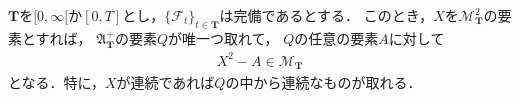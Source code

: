 	\begin{comment}
	\begin{screen}
		\begin{dfn}[ナチュラル]
			$(\Omega,\mathscr{F},P)$を確率空間とし，$\mathbf{T}$を$[0,\infty[$か$[0,T]$とし，
			$\{\mathscr{F}_t\}_{t \in \mathbf{T}}$を$\mathscr{F}$に付随するフィルトレーションとする．
			$A$が$(\Omega,\mathscr{F},P)$上の$\{\mathscr{F}_t\}_{t \in \mathbf{T}}$-増大過程であって，
			かつ$M$を任意に与えられた$(\Omega,\mathscr{F},P)$上の有界かつ$RCLL$な
			$\{\mathscr{F}_t\}_{t \in \mathbf{T}}$-マルチンゲールとするときに
			\begin{align}
				\forall t \in \mathbf{T}\, 
				\left[\, E(M_t A_t) = E \int_{(0,t]} M_{s-}\ dA_s\, \right]
			\end{align}
			を満たすならば，$A$は{\bf ナチュラル}\index{ナチュラル}{\bf (natural)}であるという．
		\end{dfn}
	\end{screen}
	\end{comment}
	
	\begin{screen}
		\begin{thm}[二乗可積分マルチンゲールは増大過程とマルチンゲールに分解できる]
		\label{thm:decomposition_of_local_martingales}
			$\mathbf{T}$を$[0,\infty[$か$[0,T]$とし，$\{\mathscr{F}_t\}_{t \in \mathbf{T}}$は完備であるとする．
			このとき，$X$を$\mathscr{M}^2_{\mathbf{T}}$の要素とすれば，
			$\mathfrak{A}^+_{\mathbf{T}}$の要素$Q$が唯一つ取れて，
			$Q$の任意の要素$A$に対して
			\begin{align}
				X^2 - A \in \mathscr{M}_{\mathbf{T}}
			\end{align}
			となる．特に，$X$が連続であれば$Q$の中から連続なものが取れる．
		\end{thm}
	\end{screen}
	
